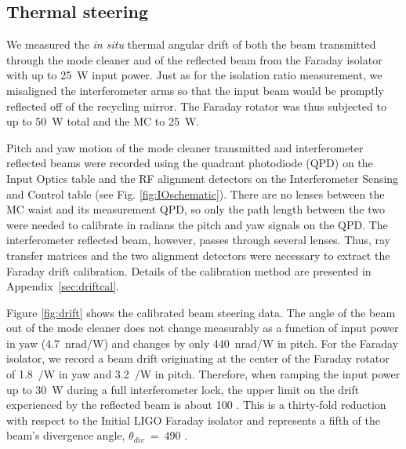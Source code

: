 \subsection{Thermal steering}
We measured the \emph{in situ} thermal angular drift of both the beam
transmitted through the mode cleaner and of the reflected beam from
the Faraday isolator with up to 25~W input power. Just as for the
isolation ratio measurement, we misaligned the interferometer arms so
that the input beam would be promptly reflected off of the recycling
mirror. The Faraday rotator was thus subjected to up to 50~W total
and the MC to 25~W. 

Pitch and yaw motion of the mode cleaner transmitted and
interferometer reflected beams were recorded using the quadrant
photodiode (QPD) on the Input Optics table and the RF alignment
detectors on the Interferometer Sensing and Control table (see
Fig. \ref{fig:IOschematic}). There are no lenses between the MC waist
and its measurement QPD, so only the path length between the two were
needed to calibrate in radians the pitch and yaw signals on the
QPD. The interferometer reflected beam, however, passes through
several lenses. Thus, ray transfer matrices and the two alignment
detectors were necessary to extract the Faraday drift
calibration. Details of the calibration method are presented in
Appendix~\ref{sec:driftcal}.

Figure \ref{fig:drift} shows the calibrated beam steering data. The
angle of the beam out of the mode cleaner does not change measurably
as a function of input power in yaw (4.7~nrad/W) and changes by only
440~nrad/W in pitch. For the Faraday isolator, we record a beam drift
originating at the center of the Faraday rotator of 1.8~\microrad/W in
yaw and 3.2~\microrad/W in pitch. Therefore, when ramping the input
power up to 30~W during a full interferometer lock, the upper limit on
the drift experienced by the reflected beam is about 100
\microrad. This is a thirty-fold reduction with respect to the Initial
LIGO Faraday isolator and represents a fifth of the beam's divergence
angle, $\theta_{div}$~=~490 \microrad.

